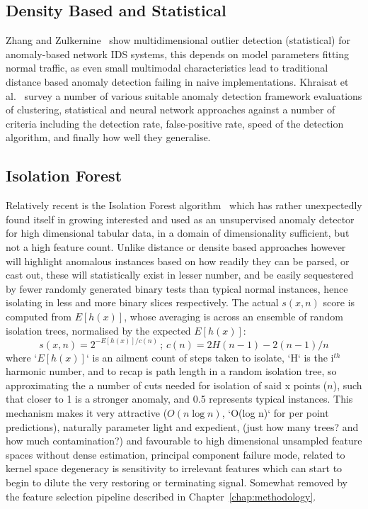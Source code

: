 \subsection{Density Based and Statistical}

Zhang and Zulkernine~\cite{zhang2006anomaly} show multidimensional outlier detection (statistical) for anomaly-based network IDS systems, this depends on model parameters fitting normal traffic, as even small multimodal characteristics lead to traditional distance based anomaly detection failing in naive implementations. Khraisat et al.~\cite{khraisat2019survey} survey a number of various suitable anomaly detection framework evaluations of clustering, statistical and neural network approaches against a number of criteria including the detection rate, false-positive rate, speed of the detection algorithm, and finally how well they generalise.

\subsection{Isolation Forest}

Relatively recent is the Isolation Forest algorithm~\cite{khraisat2019survey} which has rather unexpectedly found itself in growing interested and used as an unsupervised anomaly detector for high dimensional tabular data, in a domain of dimensionality sufficient, but not a high feature count. Unlike distance or densite based approaches however will highlight anomalous instances based on how readily they can be parsed, or cast out, these will statistically exist in lesser number, and be easily sequestered by fewer randomly generated binary tests than typical normal instances, hence isolating in less and more binary slices respectively. The actual $s(x,n)$ score is computed from $E[h(x)]$, whose averaging is across an ensemble of random isolation trees, normalised by the expected $E[h(x)]$:
\begin{equation}
s(x, n) = 2^{-E[h(x)]/c(n)}\,; \, c(n) = 2H(n-1) - 2(n-1)/n
\end{equation}
where `$E[h(x)]$` is an ailment count of steps taken to isolate, `H` is the i$^{th}$ harmonic number, and to recap is path length in a random isolation tree, so approximating the a number of cuts needed for isolation of said x points ($n$), such that closer to 1 is a stronger anomaly, and 0.5 represents typical instances. This mechanism makes it very attractive ($O(n \log n)$, `O(log n)` for per point predictions), naturally parameter light and expedient, (just how many trees? and how much contamination?) and favourable to high dimensional unsampled feature spaces without dense estimation, principal component failure mode, related to kernel space degeneracy is sensitivity to irrelevant features which can start to begin to dilute the very restoring or terminating signal. Somewhat removed by the feature selection pipeline described in Chapter~\ref{chap:methodology}.

